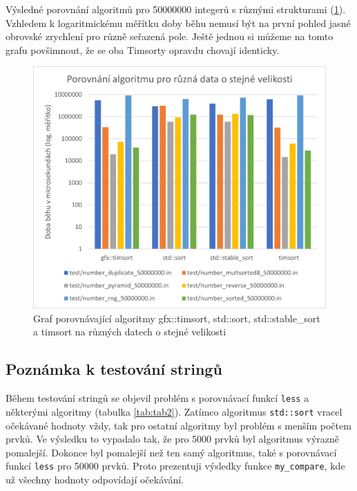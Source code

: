 \documentclass[thesis=B,czech]{FITthesis}[2019/12/23]
\begin{document}
Výsledné porovnání algoritmů pro 50000000 integerů s různými strukturami (\ref{fig:graf14}). Vzhledem k logaritmickému měřítku doby běhu nemusí být na první pohled jasné obrovské zrychlení pro různě seřazená pole. Ještě jednou si můžeme na tomto grafu povšimnout, že se oba Timsorty opravdu chovají identicky.

\begin{figure}[htbp]\centering
	\includegraphics[width=13cm]{obrazky/graf14.png}
	\caption[Graf porovnávající algoritmy gfx::timsort, std::sort, std::stable\_sort a timsort na různých datech o stejné velikosti]{Graf porovnávající algoritmy gfx::timsort, std::sort, std::stable\_sort a timsort na různých datech o stejné velikosti}\label{fig:graf14}
\end{figure}

\subsection{Poznámka k testování stringů}
Během testování stringů se objevil problém s porovnávací funkcí \texttt{less} a některými algoritmy (tabulka \ref{tab:tab2}). Zatímco algoritmus \texttt{std::sort} vracel očekávané hodnoty vždy, tak pro ostatní algoritmy byl problém s menším počtem prvků. Ve výsledku to vypadalo tak, že pro 5000 prvků byl algoritmus výrazně pomalejší. Dokonce byl pomalejší než ten samý algoritmus, také s porovnávací funkcí \texttt{less} pro 50000 prvků. Proto prezentuji výsledky funkce \texttt{my\_compare}, kde už všechny hodnoty odpovídají očekávání.
\end{document}
